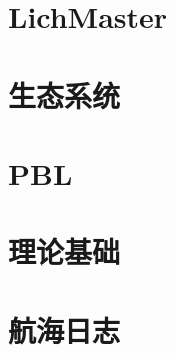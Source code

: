\documentclass[UTF8,oneside]{ctexbook}
\begin{document}
% 
% 

\part{LichMaster}





\part{生态系统}






%
%
%

\part{PBL}





\part{理论基础}





%










% 










\part{航海日志}













\end{document}
